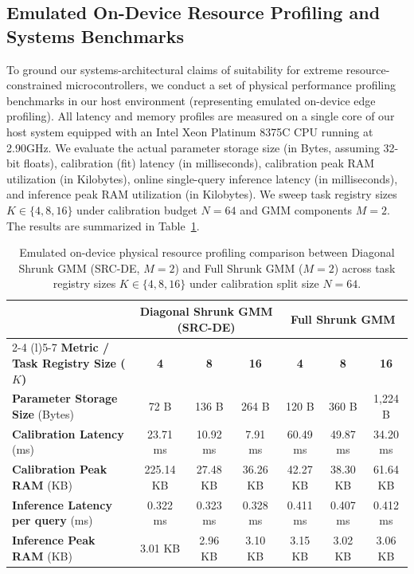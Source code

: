 \subsection{Emulated On-Device Resource Profiling and Systems Benchmarks}
\label{submission:sec:on_device_benchmarks}

To ground our systems-architectural claims of suitability for extreme resource-constrained microcontrollers, we conduct a set of physical performance profiling benchmarks in our host environment (representing emulated on-device edge profiling). All latency and memory profiles are measured on a single core of our host system equipped with an Intel Xeon Platinum 8375C CPU running at 2.90GHz. We evaluate the actual parameter storage size (in Bytes, assuming 32-bit floats), calibration (fit) latency (in milliseconds), calibration peak RAM utilization (in Kilobytes), online single-query inference latency (in milliseconds), and inference peak RAM utilization (in Kilobytes). We sweep task registry sizes $K \in \{4, 8, 16\}$ under calibration budget $N=64$ and GMM components $M=2$. The results are summarized in Table~\ref{submission:tab:benchmarks}.

\begin{table}[t]
\caption{Emulated on-device physical resource profiling comparison between Diagonal Shrunk GMM (SRC-DE, $M=2$) and Full Shrunk GMM ($M=2$) across task registry sizes $K \in \{4, 8, 16\}$ under calibration split size $N=64$.}
\label{submission:tab:benchmarks}
\vskip 0.15in
\begin{center}
\begin{small}
\begin{tabular}{lcccccc}
\toprule
& \multicolumn{3}{c}{{\bf Diagonal Shrunk GMM (SRC-DE)}} & \multicolumn{3}{c}{{\bf Full Shrunk GMM}} \\
\cmidrule(r){2-4} \cmidrule(l){5-7}
{\bf Metric / Task Registry Size ($K$)} & {\bf 4} & {\bf 8} & {\bf 16} & {\bf 4} & {\bf 8} & {\bf 16} \\
\midrule
{\bf Parameter Storage Size} (Bytes) & 72 B & 136 B & 264 B & 120 B & 360 B & 1,224 B \\
\midrule
{\bf Calibration Latency} (ms)       & 23.71 ms & 10.92 ms & 7.91 ms & 60.49 ms & 49.87 ms & 34.20 ms \\
{\bf Calibration Peak RAM} (KB)      & 225.14 KB & 27.48 KB & 36.26 KB & 42.27 KB & 38.30 KB & 61.64 KB \\
\midrule
{\bf Inference Latency per query} (ms) & 0.322 ms & 0.323 ms & 0.328 ms & 0.411 ms & 0.407 ms & 0.412 ms \\
{\bf Inference Peak RAM} (KB)         & 3.01 KB & 2.96 KB & 3.10 KB & 3.15 KB & 3.02 KB & 3.06 KB \\
\bottomrule
\end{tabular}
\end{small}
\end{center}
\vskip -0.1in
\end{table}

